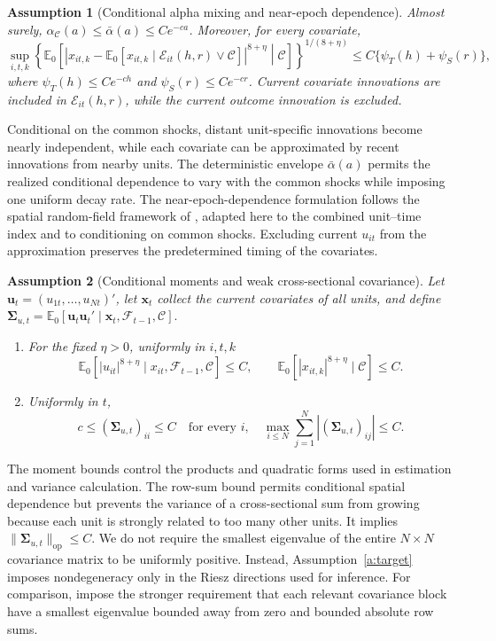 \documentclass[11pt]{article}
\numberwithin{equation}{section}
\newtheorem{assumption}{Assumption}
\theoremstyle{remark}
\newcommand{\Ezero}{\mathbb E_0}
\newcommand{\op}{\operatorname{op}}
\begin{document}
\begin{assumption}[Conditional alpha mixing and near-epoch dependence]
\label{a:ned}
Almost surely, $\alpha_{\mathscr C}(a)\le\bar\alpha(a)\le Ce^{-ca}$. Moreover, for every covariate,
\begin{equation}
\label{eq:conditional_ned}
\sup_{i,t,k}
\left\{
\Ezero\!\left[
\left|
x_{it,k}
-
\Ezero[x_{it,k}\mid\mathscr E_{it}(h,r)\vee\mathscr C]
\right|^{8+\eta}
\middle|\mathscr C
\right]
\right\}^{1/(8+\eta)}
\le
C\{\psi_T(h)+\psi_S(r)\},
\end{equation}
where $\psi_T(h)\le Ce^{-ch}$ and $\psi_S(r)\le Ce^{-cr}$. Current covariate innovations are included in $\mathscr E_{it}(h,r)$, while the current outcome innovation is excluded.
\end{assumption}
Conditional on the common shocks, distant unit-specific innovations become nearly independent, while each covariate can be approximated by recent innovations from nearby units. The deterministic envelope $\bar\alpha(a)$ permits the realized conditional dependence to vary with the common shocks while imposing one uniform decay rate. The near-epoch-dependence formulation follows the spatial random-field framework of \citet{jenishprucha2012}, adapted here to the combined unit--time index and to conditioning on common shocks. Excluding current $u_{it}$ from the approximation preserves the predetermined timing of the covariates.

\begin{assumption}[Conditional moments and weak cross-sectional covariance]
\label{a:moments}
Let $\bm u_t=(u_{1t},\ldots,u_{Nt})'$, let $\bm x_t$ collect the current covariates of all units, and define
$
\bm\Sigma_{u,t}
=
\Ezero[\bm u_t\bm u_t'\mid\bm x_t,\mathscr F_{t-1},\mathscr C].
$

\begin{enumerate}
\item[(i)] For the fixed $\eta>0$, uniformly in $i,t,k$
$$
\Ezero[|u_{it}|^{8+\eta}\mid x_{it},\mathscr F_{t-1},\mathscr C]\le C,
\qquad
\Ezero[|x_{it,k}|^{8+\eta}\mid\mathscr C]\le C.
$$

\item[(ii)] Uniformly in $t$,
$$
c\le (\bm\Sigma_{u,t})_{ii}\le C
\quad\text{for every }i, \quad
\max_{i\le N}\sum_{j=1}^{N}|(\bm\Sigma_{u,t})_{ij}|\le C.
$$
\end{enumerate}
\end{assumption}
The moment bounds control the products and quadratic forms used in estimation and variance calculation. The row-sum bound permits conditional spatial dependence but prevents the variance of a cross-sectional sum from growing because each unit is strongly related to too many other units. It implies $\|\bm\Sigma_{u,t}\|_{\op}\le C$. We do not require the smallest eigenvalue of the entire $N\times N$ covariance matrix to be uniformly positive. Instead, Assumption~\ref{a:target} imposes nondegeneracy only in the Riesz directions used for inference. For comparison, \citet{baich2021} impose the stronger requirement that each relevant covariance block have a smallest eigenvalue bounded away from zero and bounded absolute row sums.
\end{document}

